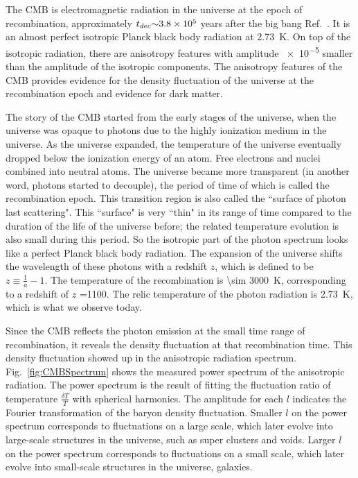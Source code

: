 The CMB is electromagnetic radiation in the universe at the epoch of recombination, approximately $t_{dec} \num{\sim 3.8e5}$ years after the big bang Ref.~\cite{Jarosik2011}. It is an almost perfect isotropic Planck black body radiation at \SI{2.73}{\kelvin}. On top of the isotropic radiation, there are anisotropy features with amplitude \num{e-5} smaller than the amplitude of the isotropic components. The anisotropy features of the CMB provides evidence for the density fluctuation of the universe at the recombination epoch and evidence for dark matter.

The story of the CMB started from the early stages of the universe, when the universe was opaque to photons due to the highly ionization medium in the universe. As the universe expanded, the temperature of the universe eventually dropped below the ionization energy of an atom. Free electrons and nuclei combined into neutral atoms. The universe became more transparent (in another word, photons started to decouple), the period of time of which is called the recombination epoch. This transition region is also called the ``surface of photon last scattering". This ``surface" is very ``thin" in its range of time compared to the duration of the life of the universe before; the related temperature evolution is also small during this period. So the isotropic part of the photon spectrum looks like a perfect Planck black body radiation. The expansion of the universe shifts the wavelength of these photons with a redshift $z$, which is defined to be $z \equiv \frac{1}{a} - 1$. The temperature of the recombination is \SI{\sim 3000}{\kelvin}, corresponding to a redshift of $z$ =1100. The relic temperature of the photon radiation is \SI{2.73}{\kelvin}, which is what we observe today.

Since the CMB reflects the photon emission at the small time range of recombination, it reveals the density fluctuation at that recombination time. This density fluctuation showed up in the anisotropic radiation spectrum. Fig.~\ref{fig:CMBSpectrum} shows the measured power spectrum of the anisotropic radiation. The power spectrum is the result of fitting the fluctuation ratio of temperature $\frac{\delta T}{T}$ with spherical harmonics. The amplitude for each $l$ indicates the Fourier transformation of the baryon density fluctuation. Smaller $l$ on the power spectrum corresponds to fluctuations on a large scale, which later evolve into large-scale structures in the universe, such as super clusters and voids. Larger $l$ on the power spectrum corresponds to fluctuations on a small scale, which later evolve into small-scale structures in the universe, galaxies.  

